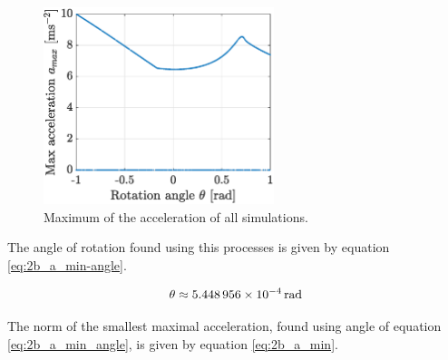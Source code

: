 \documentclass[a4paper,12pt,twoside]{article}
\begin{document}
\begin{figure}[h]
  \centering
  \includegraphics[width=0.6\textwidth]{graphs/ex5b_maxaccel.eps}
  \caption{Maximum of the acceleration of all simulations. }

\end{figure}


The angle of rotation found using this processes is given by equation \eqref{eq:2b_a_min-angle}.

\begin{equation}
  \theta \approx \SI{5.448956d-4}{\radian} %
  \label{eq:2b_a_min_angle}
\end{equation}

The norm of the smallest maximal acceleration, found using angle of equation \eqref{eq:2b_a_min_angle}, is given by equation \eqref{eq:2b_a_min}.
\end{document}
